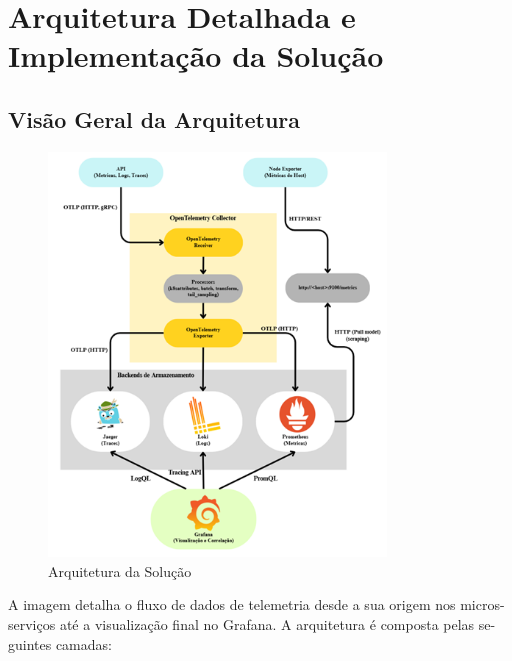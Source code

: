 \section{Arquitetura Detalhada e Implementação da Solução}

\subsection{Visão Geral da Arquitetura}

\begin{figure}[h]
    \centering
    \includegraphics[width=0.8\textwidth]{images/Diagramas/arquitetura_da_solucao.png}
    \caption{Arquitetura da Solução}
\end{figure}

A imagem detalha o fluxo de dados de telemetria desde a sua origem nos micros-serviços até a visualização final no Grafana. A arquitetura é composta pelas se-guintes camadas:

